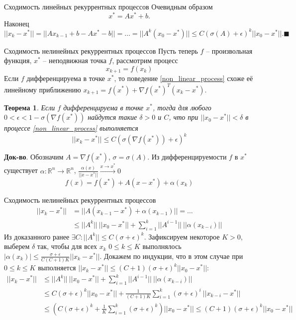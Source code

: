 \documentclass[10pt, handout]{beamer}
\newcounter{thm}
\newtheorem{theorem_ru}[thm]{Теорема}
\begin{document}
\begin{frame}{Сходимость линейных рекуррентных процессов}
Очевидным образом
$$
x^*=Ax^*+b.
$$
\pause
Наконец
$$
||x_k-x^*||=||Ax_{k-1}+b-Ax^*-b||=\ldots=||A^k(x_0-x^*)||\leq C(\sigma(A)+\epsilon)^k||x_0-x^*||.\blacksquare
$$

\end{frame}

\begin{frame}{Сходимость нелинейных рекуррентных процессов}
Пусть теперь $f$ -- произвольная функция, $x^*$ -- неподвижная точка $f$, рассмотрим процесс
\begin{equation}\label{non_linear_process}
x_{k+1}=f(x_k)
\end{equation}
\pause
Если $f$ дифференцируема в точке $x^*$, то поведение \eqref{non_linear_process} схоже её линейному приближению $x_{k+1}=f(x^*)+\nabla f(x^*)^T(x_k-x^*)$.
\pause
\begin{theorem_ru}
Если $f$ дифференцируема в точке $x^*$, тогда для любого $0<\epsilon<1-\sigma(\nabla f(x^*))$ найдутся такие $\delta>0$ и $C$, что при $||x_0-x^*||<\delta$ в процессе \eqref{non_linear_process} выполняется
$$
||x_k-x^*||\leq C(\sigma(\nabla f(x^*))+\epsilon)^k
$$
\end{theorem_ru}
\pause
\textbf{Док-во}. Обозначим $A=\nabla f(x^*)$, $\sigma=\sigma(A)$. Из дифференцируемости $f$ в $x^*$ существует $\alpha:\mathbb{R}^n\rightarrow\mathbb{R}^n$, $\frac{\alpha(x)}{||x-x^*||}\xrightarrow{x\rightarrow x^*} 0$
$$
f(x)=f(x^*)+A(x-x^*)+\alpha(x_k)
$$
\end{frame}

\begin{frame}{Сходимость нелинейных рекуррентных процессов}
\begin{align*}
||x_{k}-x^*||&=||A(x_{k-1}-x^*)+\alpha(x_{k-1})||=\ldots\\
&\leq ||A^k||~||x_0-x^*||+\sum_{i=1}^k||A^{i-1}||~||\alpha(x_{k-i})||
\end{align*}
\pause
Из доказанного ранее $\exists C: ||A^k||\leq C(\sigma+\epsilon)^k$. Зафиксируем некоторое $K>0$, выберем $\delta$ так, чтобы для всех $x_k$ $0\leq k\leq K$ выполнялось $|\alpha(x_k)|\leq \frac{\sigma+\epsilon}{C(C+1)K}||x_k-x^*||$. Докажем по индукции, что в этом случае при $0\leq k\leq K$ выполняется $||x_k-x^*||\leq (C+1)(\sigma+\epsilon)^k||x_0-x^*||$:
\pause
\begin{align*}
||x_{k}-x^*||&\leq ||A^k||~||x_0-x^*||+\sum_{i=1}^k||A^{i-1}||~||\alpha(x_{k-i})||\\
&\leq C(\sigma+\epsilon)^k||x_0-x^*||+\frac{1}{(C+1)K}\sum_{i=1}^k(\sigma+\epsilon)^{i}~||x_{k-i}-x^*||\\
&\leq \left(C(\sigma+\epsilon)^k+\frac{1}{K}\sum_{i=1}^k(\sigma+\epsilon)^k\right)||x_0-x^*|| \leq (C+1)(\sigma+\epsilon)^k||x_0-x^*||
\end{align*}

\end{frame}
\end{document}
